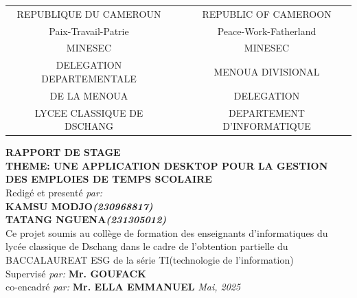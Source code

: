 \documentclass[english,12pt,a4paper]{report}
\begin{document}
\begin{spacing}{1.5}
\begin{titlepage}
\begin{center}
\begin{center}
\begin{tabular}{c c c}
	REPUBLIQUE DU CAMEROUN &             & REPUBLIC OF CAMEROON\\
	Paix-Travail-Patrie &             & Peace-Work-Fatherland\\
	\vspace{1cm} 
	MINESEC &             & MINESEC\\
	DELEGATION DEPARTEMENTALE  &             & MENOUA DIVISIONAL \\
	DE LA MENOUA &             & DELEGATION \\
	LYCEE CLASSIQUE DE DSCHANG &   \hspace{3cm}          & DEPARTEMENT D'INFORMATIQUE
\end{tabular}
\end{center}
\vspace{1.5cm}
{\huge\scshape\textbf{RAPPORT DE STAGE}}\\
\vspace{1.5cm}
{{\Large\scshape\textbf{THEME: UNE APPLICATION DESKTOP POUR LA GESTION DES EMPLOIES DE TEMPS SCOLAIRE}}\\{\Large Redigé et presenté \emph{par: }\\
\textbf{KAMSU MODJO\emph{(230968817)}\\} \textbf{TATANG NGUENA\emph{(231305012)}}\\}}
\vspace{1.2cm}
{\large{Ce projet soumis au collège de formation des enseignants d'informatiques du lycée classique de Dschang dans le cadre de l'obtention partielle du BACCALAUREAT ESG de la série TI(technologie de l'information)}\\}
\vspace{1cm}
{\large Supervisé \emph{par:}
\textbf{Mr. GOUFACK}\\
\large co-encadré \emph{par:}
\textbf{Mr. ELLA EMMANUEL}}
\vfill
{\itshape Mai, 2025}
\end{center}
\end{titlepage}
\cleardoublepage
{}

\end{spacing}
\end{document}
